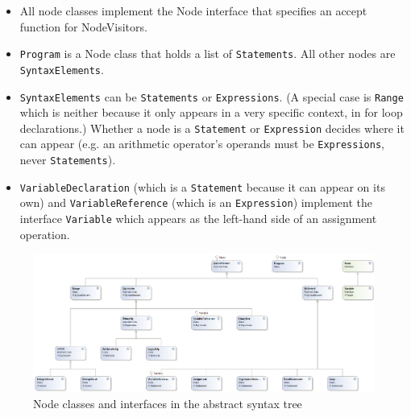\documentclass[a4paper,11pt]{article}
\begin{document}
\begin{itemize}
    \item All node classes implement the Node interface that specifies an accept function for NodeVisitors.
    \item \verb,Program, is a Node class that holds a list of \verb,Statements,. All other nodes are \verb,SyntaxElements,.
    \item \verb,SyntaxElements, can be \verb,Statements, or \verb,Expressions,. (A special case is \verb,Range, which is neither because it only appears in a very specific context, in for loop declarations.) Whether a node is a \verb,Statement, or \verb,Expression, decides where it can appear (e.g. an arithmetic operator's operands must be \verb,Expressions,, never \verb,Statements,).
    \item \verb,VariableDeclaration, (which is a \verb,Statement, because it can appear on its own) and \verb,VariableReference, (which is an \verb,Expression,) implement the interface \verb,Variable, which appears as the left-hand side of an assignment operation.
\end{itemize}

\begin{figure}
\includegraphics[scale=0.5,angle=90]{ast.png}
\caption{Node classes and interfaces in the abstract syntax tree}
\label{fig:ast}
\end{figure}
\end{document}
